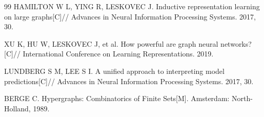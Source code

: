 \begin{thebibliography}{99}
HAMILTON W L, YING R, LESKOVEC J.
Inductive representation learning on large graphs[C]//
Advances in Neural Information Processing Systems.
2017, 30.

XU K, HU W, LESKOVEC J, et al.
How powerful are graph neural networks?[C]//
International Conference on Learning Representations.
2019.

LUNDBERG S M, LEE S I.
A unified approach to interpreting model predictions[C]//
Advances in Neural Information Processing Systems.
2017, 30.

BERGE C.
Hypergraphs: Combinatorics of Finite Sets[M].
Amsterdam: North-Holland, 1989.

\end{thebibliography}
